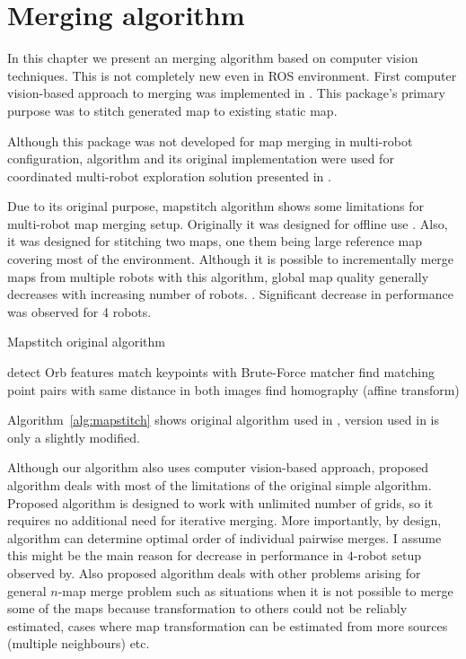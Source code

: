 \chapter{Merging algorithm}

In this chapter we present an merging algorithm based on computer vision techniques. This is not completely new even in ROS environment. First computer vision-based approach to merging was implemented in \cite{MapstitchROS}. This package's primary purpose was to stitch generated map to existing static map.

Although this package was not developed for map merging in multi-robot configuration, algorithm and its original implementation were used for coordinated multi-robot exploration solution presented in \cite{Andre2014}.

Due to its original purpose, mapstitch algorithm shows some limitations for multi-robot map merging setup. Originally it was designed for offline use \cite{Andre2014}. Also, it was designed for stitching two maps, one them being large reference map covering most of the environment. Although it is possible to incrementally merge maps from multiple robots with this algorithm, global map quality generally decreases with increasing number of robots. \cite{Andre2014}. Significant decrease in performance was observed for 4 robots\cite{Andre2014}.

\begin{algorithm}
    \caption{Mapstitch original algorithm}
    \label{alg:mapstitch}
    \begin{algorithmic}[1]
            \State detect Orb features
            \State match keypoints with Brute-Force matcher
            \State find matching point pairs with same distance in both images
            \State find homography (affine transform)
        \EndProcedure
    \end{algorithmic}
\end{algorithm}

Algorithm~\ref{alg:mapstitch} shows original algorithm used in \cite{MapstitchROS}, version used in \cite{Andre2014} is only a slightly modified.

Although our algorithm also uses computer vision-based approach, proposed algorithm deals with most of the limitations of the original simple algorithm. Proposed algorithm is designed to work with unlimited number of grids, so it requires no additional need for iterative merging. More importantly, by design, algorithm can determine optimal order of individual pairwise merges. I assume this might be the main reason for decrease in performance in $4$-robot setup observed by\cite{Andre2014}. Also proposed algorithm deals with other problems arising for general $n$-map merge problem such as situations when it is not possible to merge some of the maps because transformation to others could not be reliably estimated, cases where map transformation can be estimated from more sources (multiple neighbours) etc.

